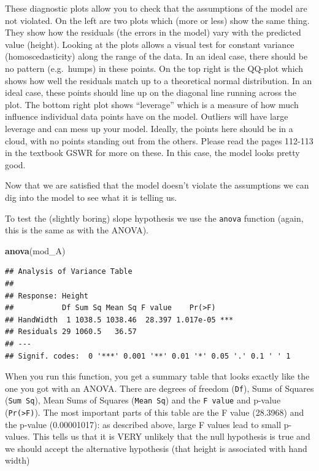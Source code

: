 \documentclass[
  a4paperpaper,
]{book}
\newenvironment{Shaded}{\begin{snugshade}}{\end{snugshade}}
\newcommand{\KeywordTok}[1]{\textcolor[rgb]{0.13,0.29,0.53}{\textbf{#1}}}
\newcommand{\NormalTok}[1]{#1}
\begin{document}
These diagnostic plots allow you to check that the assumptions of the model are not violated. On the left are two plots which (more or less) show the same thing. They show how the residuals (the errors in the model) vary with the predicted value (height). Looking at the plots allows a visual test for constant variance (homoscedasticity) along the range of the data. In an ideal case, there should be no pattern (e.g.~humps) in these points. On the top right is the QQ-plot which shows how well the residuals match up to a theoretical normal distribution. In an ideal case, these points should line up on the diagonal line running across the plot. The bottom right plot shows ``leverage'' which is a measure of how much influence individual data points have on the model. Outliers will have large leverage and can mess up your model. Ideally, the points here should be in a cloud, with no points standing out from the others. Please read the pages 112-113 in the textbook GSWR for more on these. In this case, the model looks pretty good.

Now that we are satisfied that the model doesn't violate the assumptions we can dig into the model to see what it is telling us.

To test the (slightly boring) slope hypothesis we use the \texttt{anova} function (again, this is the same as with the ANOVA).

\begin{Shaded}
\begin{Highlighting}[]
\KeywordTok{anova}\NormalTok{(mod\_A)}
\end{Highlighting}
\end{Shaded}

\begin{verbatim}
## Analysis of Variance Table
## 
## Response: Height
##           Df Sum Sq Mean Sq F value    Pr(>F)    
## HandWidth  1 1038.5 1038.46  28.397 1.017e-05 ***
## Residuals 29 1060.5   36.57                      
## ---
## Signif. codes:  0 '***' 0.001 '**' 0.01 '*' 0.05 '.' 0.1 ' ' 1
\end{verbatim}

When you run this function, you get a summary table that looks exactly like the one you got with an ANOVA. There are degrees of freedom (\texttt{Df}), Sums of Squares (\texttt{Sum\ Sq}), Mean Sums of Squares (\texttt{Mean\ Sq}) and the \texttt{F\ value} and p-value (\texttt{Pr(\textgreater{}F)}).
The most important parts of this table are the F value (28.3968) and the p-value (0.00001017): as described above, large F values lead to small p-values. This tells us that it is VERY unlikely that the null hypothesis is true and we should accept the alternative hypothesis (that height is associated with hand width)
\end{document}
